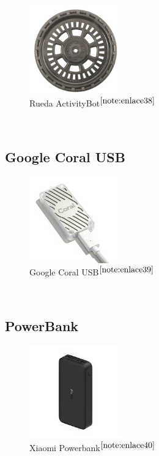 \begin{figure} [h!]
	\begin{center}
		\includegraphics[width=4cm]{figs/wheel.png}
	\end{center}
	\caption{Rueda ActivityBot$^{\ref{note:enlace38}}$} 
\label{fig:wheel}
\end{figure}\

\setcounter{footnote}{38} %

\subsection{Google Coral USB}

\begin{figure} [h!]
	\begin{center}
		\includegraphics[width=4cm]{figs/googlecoral.png}
	\end{center}
	\caption{Google Coral USB$^{\ref{note:enlace39}}$} 
	\label{fig:googlecoral}
\end{figure}\

\setcounter{footnote}{39} %

\subsection{PowerBank}

\begin{figure} [h!]
	\begin{center}
		\includegraphics[width=4cm]{figs/powerbank.png}
	\end{center}
	\caption{Xiaomi Powerbank$^{\ref{note:enlace40}}$} 
	\label{fig:powerbank}
\end{figure}\

